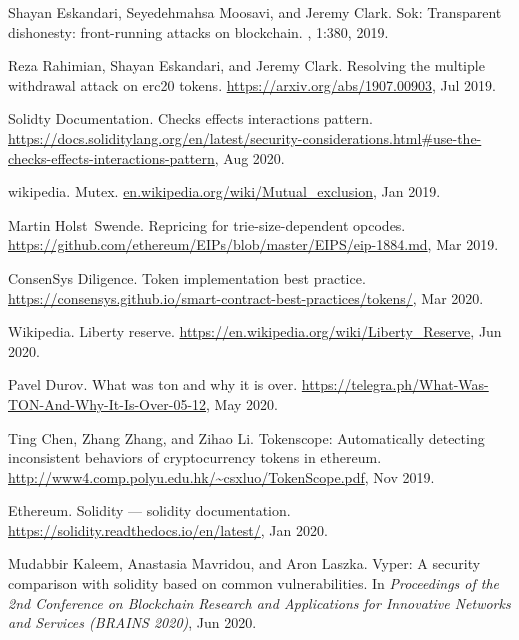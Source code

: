 \begin{thebibliography}{10}
Shayan Eskandari, Seyedehmahsa Moosavi, and Jeremy Clark.
\newblock Sok: Transparent dishonesty: front-running attacks on blockchain.
, 1:380, 2019.

Reza Rahimian, Shayan Eskandari, and Jeremy Clark.
\newblock Resolving the multiple withdrawal attack on erc20 tokens.
\newblock \url{https://arxiv.org/abs/1907.00903}, Jul 2019.

Solidty Documentation.
\newblock Checks effects interactions pattern.
\newblock
  \url{https://docs.soliditylang.org/en/latest/security-considerations.html\#use-the-checks-effects-interactions-pattern},
  Aug 2020.

wikipedia.
\newblock Mutex.
\newblock \url{en.wikipedia.org/wiki/Mutual_exclusion}, Jan 2019.

Martin Holst~Swende.
\newblock Repricing for trie-size-dependent opcodes.
\newblock \url{https://github.com/ethereum/EIPs/blob/master/EIPS/eip-1884.md},
  Mar 2019.

ConsenSys Diligence.
\newblock Token implementation best practice.
\newblock
  \url{https://consensys.github.io/smart-contract-best-practices/tokens/}, Mar
  2020.

Wikipedia.
\newblock Liberty reserve.
\newblock \url{https://en.wikipedia.org/wiki/Liberty_Reserve}, Jun 2020.

Pavel Durov.
\newblock What was ton and why it is over.
\newblock \url{https://telegra.ph/What-Was-TON-And-Why-It-Is-Over-05-12}, May
  2020.

Ting Chen, Zhang Zhang, and Zihao Li.
\newblock Tokenscope: Automatically detecting inconsistent behaviors of
  cryptocurrency tokens in ethereum.
\newblock \url{http://www4.comp.polyu.edu.hk/~csxluo/TokenScope.pdf}, Nov 2019.

Ethereum.
\newblock Solidity --- solidity documentation.
\newblock \url{https://solidity.readthedocs.io/en/latest/}, Jan 2020.

Mudabbir Kaleem, Anastasia Mavridou, and Aron Laszka.
\newblock Vyper: A security comparison with solidity based on common
  vulnerabilities.
\newblock In {\em Proceedings of the 2nd Conference on Blockchain Research and
  Applications for Innovative Networks and Services (BRAINS 2020)}, Jun 2020.


\end{thebibliography}
